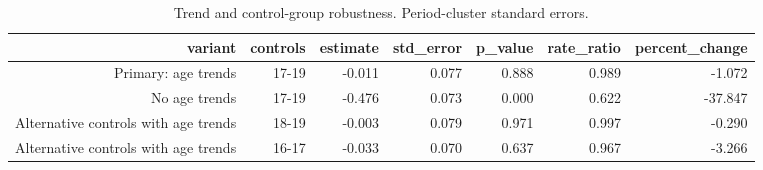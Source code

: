 \begin{table}[!htbp]
\centering
\caption{Trend and control-group robustness. Period-cluster standard errors.} 
\label{tab:registry_robustness}
\begingroup\small
\begin{tabular}{rrrrrrr}
  \hline
variant & controls & estimate & std\_error & p\_value & rate\_ratio & percent\_change \\ 
  \hline
Primary: age trends & 17-19 & -0.011 & 0.077 & 0.888 & 0.989 & -1.072 \\ 
  No age trends & 17-19 & -0.476 & 0.073 & 0.000 & 0.622 & -37.847 \\ 
  Alternative controls with age trends & 18-19 & -0.003 & 0.079 & 0.971 & 0.997 & -0.290 \\ 
  Alternative controls with age trends & 16-17 & -0.033 & 0.070 & 0.637 & 0.967 & -3.266 \\ 
   \hline
\end{tabular}
\endgroup
\end{table}

